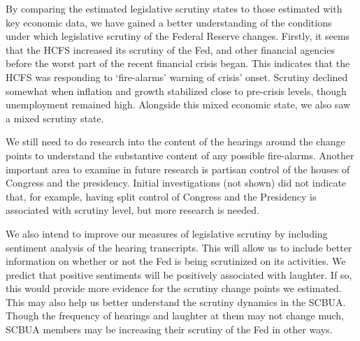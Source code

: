 \documentclass[a4paper]{article}\usepackage[]{graphicx}\usepackage[]{color}
\begin{document}
By comparing the estimated legislative scrutiny states to those estimated with key economic data, we have gained a better understanding of the conditions under which legislative scrutiny of the Federal Reserve changes. Firstly, it seems that the HCFS increased its scrutiny of the Fed, and other financial agencies before the worst part of the recent financial crisis began. This indicates that the HCFS was responding to `fire-alarms' warning of crisis' onset. Scrutiny declined somewhat when inflation and growth stabilized close to pre-crisis levels, though unemployment remained high. Alongside this mixed economic state, we also saw a mixed scrutiny state.

We still need to do research into the content of the hearings around the change points to understand the substantive content of any possible fire-alarms. Another important area to examine in future research is partisan control of the houses of Congress and the presidency. Initial investigations (not shown) did not indicate that, for example, having split control of Congress and the Presidency is associated with scrutiny level, but more research is needed.

We also intend to improve our measures of legislative scrutiny by including sentiment analysis of the hearing transcripts. This will allow us to include better information on whether or not the Fed is being scrutinized on its activities. We predict that positive sentiments will be positively associated with laughter. If so, this would provide more evidence for the scrutiny change points we estimated. This may also help us better understand the scrutiny dynamics in the SCBUA. Though the frequency of hearings and laughter at them may not change much, SCBUA members may be increasing their scrutiny of the Fed in other ways. 






\end{document}
